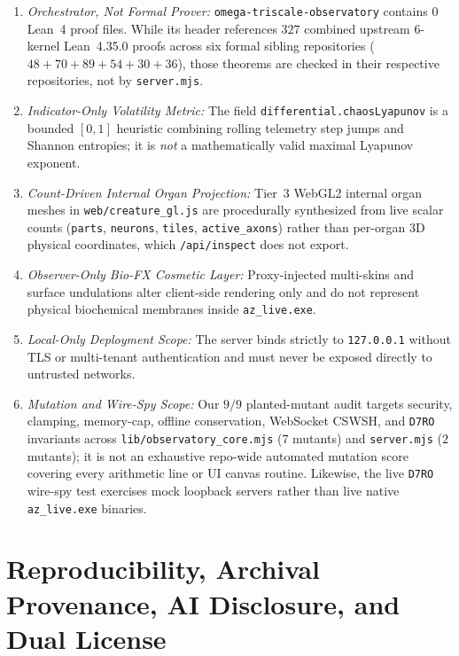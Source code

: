 \documentclass[11pt,reqno]{amsart}
\theoremstyle{definition}
\newcommand{\code}[1]{{\footnotesize\nolinkurl{#1}}}
\begin{document}
\begin{enumerate}[leftmargin=1.5em,itemsep=2pt]
  \item \emph{Orchestrator, Not Formal Prover:} \code{omega-triscale-observatory} contains $0$ Lean~4 proof files. While its header references $327$ combined upstream 6-kernel Lean~4.35.0 proofs across six formal sibling repositories ($48 + 70 + 89 + 54 + 30 + 36$), those theorems are checked in their respective repositories, not by \code{server.mjs}.
  \item \emph{Indicator-Only Volatility Metric:} The field \code{differential.chaosLyapunov} is a bounded $[0,1]$ heuristic combining rolling telemetry step jumps and Shannon entropies; it is \emph{not} a mathematically valid maximal Lyapunov exponent.
  \item \emph{Count-Driven Internal Organ Projection:} Tier~3 WebGL2 internal organ meshes in \code{web/creature\_gl.js} are procedurally synthesized from live scalar counts (\code{parts}, \code{neurons}, \code{tiles}, \code{active\_axons}) rather than per-organ 3D physical coordinates, which \code{/api/inspect} does not export.
  \item \emph{Observer-Only Bio-FX Cosmetic Layer:} Proxy-injected multi-skins and surface undulations alter client-side rendering only and do not represent physical biochemical membranes inside \code{az\_live.exe}.
  \item \emph{Local-Only Deployment Scope:} The server binds strictly to \code{127.0.0.1} without TLS or multi-tenant authentication and must never be exposed directly to untrusted networks.
  \item \emph{Mutation and Wire-Spy Scope:} Our $9/9$ planted-mutant audit targets security, clamping, memory-cap, offline conservation, WebSocket CSWSH, and \code{D7RO} invariants across \code{lib/observatory\_core.mjs} ($7$ mutants) and \code{server.mjs} ($2$ mutants); it is not an exhaustive repo-wide automated mutation score covering every arithmetic line or UI canvas routine. Likewise, the live \code{D7RO} wire-spy test exercises mock loopback servers rather than live native \code{az\_live.exe} binaries.
\end{enumerate}

\section{Reproducibility, Archival Provenance, AI Disclosure, and Dual License}
\label{sec:repro}
\end{document}
